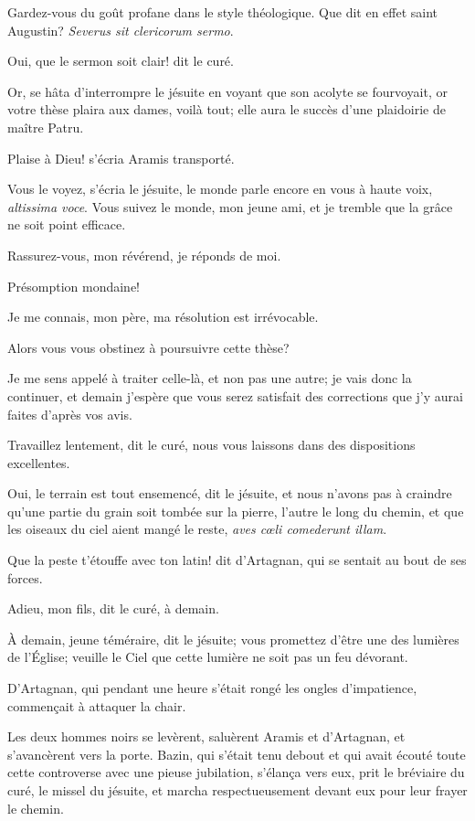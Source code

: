 \begin{conversation}
Gardez-vous du goût profane dans le style théologique. Que dit en effet saint Augustin? \textit{Severus sit clericorum sermo}. 

\speak Oui, que le sermon soit clair! dit le curé. 

\speak Or, se hâta d'interrompre le jésuite en voyant que son acolyte se fourvoyait, or votre thèse plaira aux dames, voilà tout; elle aura le succès d'une plaidoirie de maître Patru. 

\speak Plaise à Dieu! s'écria Aramis transporté. 

\speak Vous le voyez, s'écria le jésuite, le monde parle encore en vous à haute voix, \textit{altissima voce}. Vous suivez le monde, mon jeune ami, et je tremble que la grâce ne soit point efficace. 

\speak Rassurez-vous, mon révérend, je réponds de moi. 

\speak Présomption mondaine! 

\speak Je me connais, mon père, ma résolution est irrévocable. 

\speak Alors vous vous obstinez à poursuivre cette thèse? 

\speak Je me sens appelé à traiter celle-là, et non pas une autre; je vais donc la continuer, et demain j'espère que vous serez satisfait des corrections que j'y aurai faites d'après vos avis. 

\speak Travaillez lentement, dit le curé, nous vous laissons dans des dispositions excellentes. 

\speak Oui, le terrain est tout ensemencé, dit le jésuite, et nous n'avons pas à craindre qu'une partie du grain soit tombée sur la pierre, l'autre le long du chemin, et que les oiseaux du ciel aient mangé le reste, \textit{aves cœli comederunt illam}. 

\speak Que la peste t'étouffe avec ton latin! dit d'Artagnan, qui se sentait au bout de ses forces. 

\speak Adieu, mon fils, dit le curé, à demain. 

\speak À demain, jeune téméraire, dit le jésuite; vous promettez d'être une des lumières de l'Église; veuille le Ciel que cette lumière ne soit pas un feu dévorant.
\end{conversation}

D'Artagnan, qui pendant une heure s'était rongé les ongles d'impatience, commençait à attaquer la chair. 

Les deux hommes noirs se levèrent, saluèrent Aramis et d'Artagnan, et s'avancèrent vers la porte. Bazin, qui s'était tenu debout et qui avait écouté toute cette controverse avec une pieuse jubilation, s'élança vers eux, prit le bréviaire du curé, le missel du jésuite, et marcha respectueusement devant eux pour leur frayer le chemin. 


